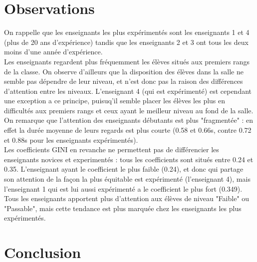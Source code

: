 \documentclass{article}
\begin{document}
\section{Observations}
On rappelle que les enseignants les plus expérimentés sont les enseignants 1 et 4 (plus de 20 ans d'expérience) tandis que les enseignants 2 et 3 ont tous les deux moins d'une année d'expérience.\\
Les enseignants regardent plus fréquemment les élèves situés aux premiers rangs de la classe. On observe d'ailleurs que la disposition des élèves dans la salle ne semble pas dépendre de leur niveau, et n'est donc pas la raison des différences d'attention entre les niveaux. L'enseignant 4 (qui est expérimenté) est cependant une exception a ce principe, puisuq'il semble placer les élèves les plus en difficultés aux premiers rangs et ceux ayant le meilleur niveau au fond de la salle.\\
On remarque que l'attention des enseignants débutants est plus "fragmentée" : en effet la durée moyenne de leurs regards est plus courte (0.58 et 0.66s, contre 0.72 et 0.88s pour les enseignants expérimentés).\\
Les coefficients GINI en revanche ne permettent pas de différencier les enseignants novices et experimentés : tous les coefficients sont situés entre 0.24 et 0.35. L'enseignant ayant le coefficient le plus faible (0.24), et donc qui partage son attention de la façon la plus équitable est expérimenté (l'enseignant 4), mais l'enseignant 1 qui est lui aussi expérimenté a le coefficient le plus fort (0.349).\\
Tous les enseignants apportent plus d'attention aux élèves de niveau "Faible" ou "Passable", mais cette tendance est plus marquée chez les enseignants les plus expérimentés.

\section{Conclusion}

{}

\end{document}
